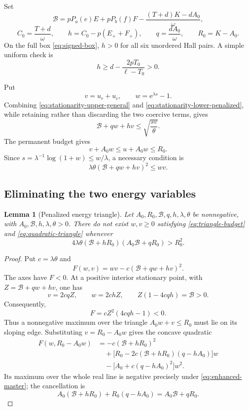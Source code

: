 \documentclass[11pt]{article}
\newtheorem{lemma}[theorem]{Lemma}
\theoremstyle{definition}
\newcommand{\e}{\mathrm e}
\begin{document}
Set
\[
 \mathcal B=
 pP_a(e)E+pP_b(f)F
 -\frac{(T+d)K-dA_0}{\omega},
 \tag{4.15}\label{eq:B-general}
\]
\[
 C_0=\frac{T+d}{\omega},
 \qquad
 h=C_0-p(E_++F_+),
 \qquad
 q=\frac{dA_0}{\omega},
 \qquad
 R_0=K-A_0.
 \tag{4.16}\label{eq:hqR}
\]
On the full box \eqref{eq:signed-box}, $h>0$ for all six unordered Hall pairs.
A simple uniform check is
\[
 h\ge d-\frac{2pT_0}{\ell-T_0}>0.
 \tag{4.17}\label{eq:h-positive}
\]

Put
\[
 v=u_r+u_c,
 \qquad
 w=\e^{\lambda s}-1.
\]
Combining \eqref{eq:stationarity-upper-general} and
\eqref{eq:stationarity-lower-penalized}, while retaining rather than discarding
the two coercive terms, gives
\[
 \mathcal B+qw+hv\le\sqrt{\frac{sv}{\theta}}.
 \tag{4.18}\label{eq:penalized-energy}
\]
The permanent budget gives
\[
 v+A_0w\le u+A_0w\le R_0.
 \tag{4.19}\label{eq:triangle-budget}
\]
Since $s=\lambda^{-1}\log(1+w)\le w/\lambda$, a necessary condition is
\[
 \lambda\theta(\mathcal B+qw+hv)^2\le wv.
 \tag{4.20}\label{eq:quadratic-triangle}
\]

\subsection{Eliminating the two energy variables}

\begin{lemma}[Penalized energy triangle]\label{lem:penalized-triangle}
Let
$A_0,R_0,\mathcal B,q,h,\lambda,\theta$ be nonnegative, with
$A_0,\mathcal B,h,\lambda,\theta>0$.  There do not exist $w,v\ge0$ satisfying
\eqref{eq:triangle-budget} and \eqref{eq:quadratic-triangle} whenever
\[
 4\lambda\theta
 (\mathcal B+hR_0)(A_0\mathcal B+qR_0)>R_0^2.
 \tag{4.21}\label{eq:enhanced-master}
\]
\end{lemma}

\begin{proof}
Put $c=\lambda\theta$ and
\[
 F(w,v)=wv-c(\mathcal B+qw+hv)^2.
\]
The axes have $F<0$.  At a positive interior stationary point, with
$Z=\mathcal B+qw+hv$, one has
\[
 v=2cqZ,
 \qquad w=2chZ,
 \qquad Z(1-4cqh)=\mathcal B>0.
\]
Consequently,
\[
 F=cZ^2(4cqh-1)<0.
\]
Thus a nonnegative maximum over the triangle
$A_0w+v\le R_0$ must lie on its sloping edge.  Substituting
$v=R_0-A_0w$ gives the concave quadratic
\[
 \begin{aligned}
 F(w,R_0-A_0w)
 &=-c(\mathcal B+hR_0)^2\\
 &\quad+\bigl[R_0-2c(\mathcal B+hR_0)(q-hA_0)\bigr]w\\
 &\quad-\bigl[A_0+c(q-hA_0)^2\bigr]w^2.
 \end{aligned}
\]
Its maximum over the whole real line is negative precisely under
\eqref{eq:enhanced-master}; the cancellation is
\[
 A_0(\mathcal B+hR_0)+R_0(q-hA_0)=A_0\mathcal B+qR_0.
\]
\end{proof}
\end{document}
